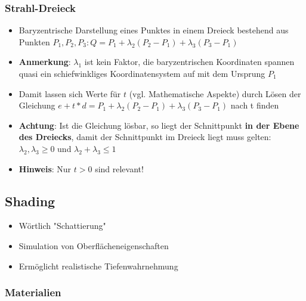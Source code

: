 \documentclass[10pt,a4paper]{article}
\begin{document}
	\subsubsection{Strahl-Dreieck}
	\label{rt:ssub:strahl_dreieck}
	
	\begin{itemize}
		\item Baryzentrische Darstellung eines Punktes in einem Dreieck bestehend aus Punkten $P_1, P_2, P_3: Q = P_1 + \lambda_2(P_2 - P_1) + \lambda_3(P_3 - P_1)$
		\item \textbf{Anmerkung}: $\lambda_1$ ist kein Faktor, die baryzentrischen Koordinaten spannen quasi ein schiefwinkliges Koordinatensystem auf mit dem Ursprung $P_1$
		\item Damit lassen sich Werte für $t$ (vgl. Mathematische Aspekte) durch Lösen der Gleichung $e + t * d = P_1 + \lambda_2(P_2 - P_1) + \lambda_3(P_3 - P_1)$ nach t finden
		\item \textbf{Achtung}: Ist die Gleichung lösbar, so liegt der Schnittpunkt \textbf{in der Ebene des Dreiecks}, damit der Schnittpunkt im Dreieck liegt muss gelten: $\lambda_2, \lambda_3 \geq 0$ und $\lambda_2 + \lambda_3 \leq 1$
		\item \textbf{Hinweis}: Nur $t > 0$ sind relevant!
	\end{itemize}

	\subsection{Shading}
	\label{rt:sub:shading}

	\begin{itemize}
		\item Wörtlich "Schattierung"
		\item Simulation von Oberflächeneigenschaften
		\item Ermöglicht realistische Tiefenwahrnehmung
	\end{itemize}

	\subsubsection{Materialien}
	\label{rt:ssub:materialien}
\end{document}
